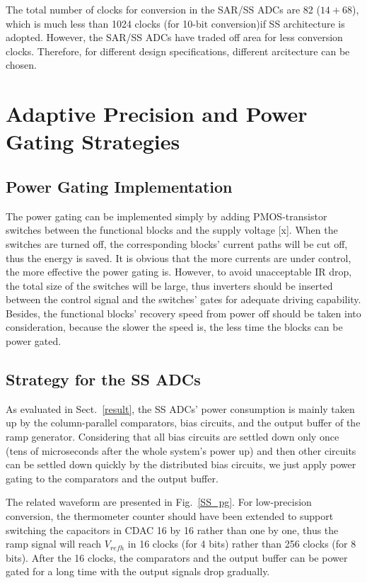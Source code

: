 \documentclass[conference]{IEEEtran}
\begin{document}
 The total number of clocks for conversion in the SAR/SS ADCs are 82 ($14+68$), which is much less than 1024 clocks (for 10-bit conversion)if SS architecture is adopted. 
 However, the SAR/SS ADCs have traded off area for less conversion clocks. Therefore, for different design specifications, different arcitecture can be chosen.

\section{Adaptive Precision and Power Gating Strategies}\label{strategy}

\subsection{Power Gating Implementation}

The power gating can be implemented simply by adding PMOS-transistor switches between the functional blocks and the supply voltage [x]. 
When the switches are turned off, the corresponding blocks’ current paths will be cut off, thus the energy is saved. 
It is obvious that the more currents are under control, the more effective the power gating is. However, to avoid unacceptable IR drop, the total size of the switches will be large, 
thus inverters should be inserted between the control signal and the switches’ gates for adequate driving capability. 
Besides, the functional blocks’ recovery speed from power off should be taken into consideration, because the slower the speed is, the less time the blocks can be power gated. 

\subsection{Strategy for the SS ADCs}
As evaluated in Sect.~\ref{result}, the SS ADCs’ power consumption is mainly taken up by the column-parallel comparators, bias circuits, and the output buffer of the ramp generator. 
Considering that all bias circuits are settled down only once (tens of microseconds after the whole system's power up) and then other circuits can be settled down quickly by the distributed 
bias circuits, we just apply power gating to the comparators and the output buffer.

The related waveform are presented in Fig.~\ref{SS_pg}. For low-precision conversion, the thermometer counter should have been extended to support switching the capacitors in CDAC 16 by 16 
rather than one by one, thus the ramp signal will reach $V_{refh}$ in 16 clocks (for 4 bits) rather than 256 clocks (for 8 bits). After the 16 clocks, the comparators and the output buffer 
can be power gated for a long time with the output signals drop gradually.
\end{document}
